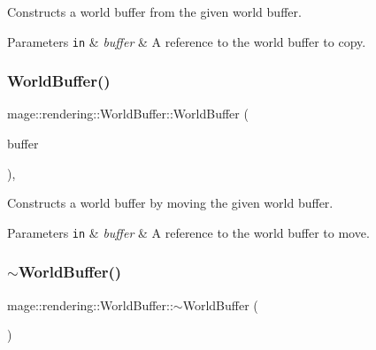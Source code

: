 Constructs a world buffer from the given world buffer.


\begin{DoxyParams}[1]{Parameters}
\mbox{\tt in}  & {\em buffer} & A reference to the world buffer to copy. \\
\hline
\end{DoxyParams}
\hypertarget{structmage_1_1rendering_1_1_world_buffer_ab5cce49c9fe1bbe5e7db5f98df3dbf1a}{}\label{structmage_1_1rendering_1_1_world_buffer_ab5cce49c9fe1bbe5e7db5f98df3dbf1a} 
\subsubsection{\texorpdfstring{World\+Buffer()}{WorldBuffer()}\hspace{0.1cm}{\footnotesize\ttfamily [3/3]}}
{\footnotesize\ttfamily mage\+::rendering\+::\+World\+Buffer\+::\+World\+Buffer (\begin{DoxyParamCaption}\item[{\hyperlink{structmage_1_1rendering_1_1_world_buffer}{World\+Buffer} \&\&}]{buffer }\end{DoxyParamCaption})\hspace{0.3cm}{\ttfamily [default]}, {\ttfamily [noexcept]}}

Constructs a world buffer by moving the given world buffer.


\begin{DoxyParams}[1]{Parameters}
\mbox{\tt in}  & {\em buffer} & A reference to the world buffer to move. \\
\hline
\end{DoxyParams}
\hypertarget{structmage_1_1rendering_1_1_world_buffer_afdfdecc619400706fa89e24f3ce14a43}{}\label{structmage_1_1rendering_1_1_world_buffer_afdfdecc619400706fa89e24f3ce14a43} 
\subsubsection{\texorpdfstring{$\sim$\+World\+Buffer()}{~WorldBuffer()}}
{\footnotesize\ttfamily mage\+::rendering\+::\+World\+Buffer\+::$\sim$\+World\+Buffer (\begin{DoxyParamCaption}{ }\end{DoxyParamCaption})\hspace{0.3cm}{\ttfamily [default]}}

